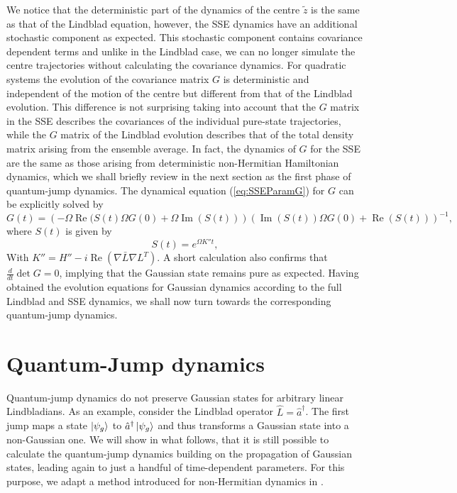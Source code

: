 \documentclass[12pt]{iopart} %
\renewcommand{\Re}{\operatorname{Re}}
\renewcommand{\Im}{\operatorname{Im}}
\begin{document}
We notice that the deterministic part of the dynamics of the centre $\tilde z$ is the same as that of the Lindblad equation, however, the SSE dynamics have an additional stochastic component as expected. This stochastic component contains covariance dependent terms and unlike in the Lindblad case, we can no longer simulate the centre trajectories without calculating the covariance dynamics. For quadratic systems the evolution of the covariance matrix $G$ is deterministic and independent of the motion of the centre but different from that of the Lindblad evolution. This difference is not surprising taking into account that the $G$ matrix in the SSE describes the covariances of the individual pure-state trajectories, while the $G$ matrix of the Lindblad evolution describes that of the total density matrix arising from the ensemble average. In fact, the dynamics of $G$ for the SSE are the same as those arising from deterministic non-Hermitian Hamiltonian dynamics, which we shall briefly review in the next section as the first phase of quantum-jump dynamics. 
The dynamical equation (\ref{eq:SSEParamG}) for $G$ can be explicitly solved by \cite{graefe2012complexified}
\begin{equation} \label{eq:GtS}
        G(t)=\left(-\Omega \Re(S(t)\Omega G(0) +\Omega \Im(S(t))\right)\left(\Im(S(t))\Omega G(0)+\Re (S(t)) \right)^{-1},
\end{equation}
where $S(t)$ is given by 
\begin{equation}
  S(t)=e^{\Omega K''t},
\end{equation}
With $K''=H''- i \Re(\nabla \bar{L} \nabla L^T)$. A short calculation also confirms that $\frac{d}{dt}\det G=0$, implying that the Gaussian state remains pure as expected. Having obtained the evolution equations for Gaussian dynamics according to the full Lindblad and SSE dynamics, we shall now turn towards the corresponding quantum-jump dynamics.

\section{Quantum-Jump dynamics} \label{sec:HagJumps}


 Quantum-jump dynamics do not preserve Gaussian states for arbitrary linear Lindbladians. As an example, consider the Lindblad operator $\hat L=\hat a^{\dagger}$. The first jump maps a state $\ket{\psi_g}$ to $ \hat a^{\dagger}\ket{\psi_g}$ and thus transforms a Gaussian state into a non-Gaussian one. We will show in what follows, that it is still possible to calculate the quantum-jump dynamics building on the propagation of Gaussian states, leading again to just a handful of time-dependent parameters. For this purpose, we adapt a method introduced for non-Hermitian dynamics in \cite{lasser2018non}. 
 
\end{document}
